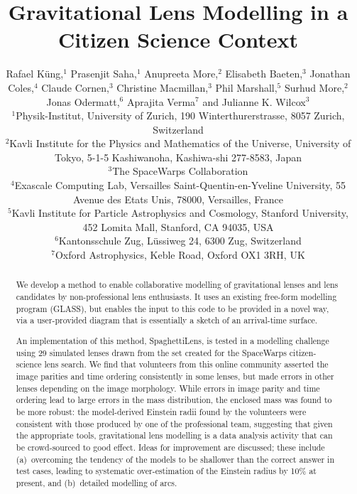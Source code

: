 \documentclass[usenatbib]{mn2e}
\newcommand{\spl}{SpaghettiLens\xspace}
\newcommand{\sw}{SpaceWarps\xspace}
\begin{document}
\title{Gravitational Lens Modelling in a Citizen Science Context}

\author[Küng et al]{Rafael Küng,$^{1}$
Prasenjit Saha,$^{1}$
Anupreeta More,$^{2}$
Elisabeth Baeten,$^{3}$
\newauthor
Jonathan Coles,$^{4}$
Claude Cornen,$^{3}$
Christine Macmillan,$^{3}$
Phil Marshall,$^{5}$ 
\newauthor
Surhud More,$^{2}$
Jonas Odermatt,$^{6}$
Aprajita Verma$^{7}$
and Julianne K. Wilcox$^{3}$
%
\\
%
$^{1}$Physik-Institut, University of Zurich, 190 Winterthurerstrasse, 8057 Zurich, Switzerland\\
$^{2}$Kavli Institute for the Physics and Mathematics of the Universe, University of Tokyo, 5-1-5 Kashiwanoha, Kashiwa-shi 277-8583, Japan\\
$^{3}$The SpaceWarps Collaboration\\
$^{4}$Exascale Computing Lab, Versailles Saint-Quentin-en-Yveline University, 55 Avenue des Etats Unis, 78000, Versailles, France\\
$^{5}$Kavli Institute for Particle Astrophysics and Cosmology, Stanford University, 452 Lomita Mall, Stanford, CA 94035, USA\\
$^{6}$Kantonsschule Zug, L\"ussiweg 24, 6300 Zug, Switzerland\\
$^{7}$Oxford Astrophysics, Keble Road, Oxford OX1 3RH, UK\\
}

\maketitle

\begin{abstract}

We develop a method to enable collaborative modelling of gravitational
lenses and lens candidates by non-professional lens enthusiasts.  It
uses an existing free-form modelling program (GLASS), but
enables the input to this code to be provided in a novel way,
via a user-provided diagram that is essentially a sketch of an
arrival-time surface.

An implementation of this method, \spl, is tested in a modelling
challenge using 29 simulated lenses drawn from the set created
for the \sw citizen-science lens search.  We find that
volunteers from this online community asserted the image
parities and time ordering consistently in some lenses, but made
errors in other lenses depending on the image morphology. While
errors in image parity and time ordering lead to  large errors in the
mass distribution, the enclosed mass was found to be more
robust: the model-derived Einstein radii found by the volunteers were
consistent with those produced by one of the professional team,
suggesting that given the appropriate tools, gravitational lens
modelling is a data analysis activity that can be crowd-sourced to
good effect. Ideas for improvement are discussed; these include
(a)~overcoming the tendency of the models to be shallower than the
correct answer in test cases, leading to systematic over-estimation of
the Einstein radius by 10\% at present, and (b)~detailed modelling of
arcs.

\end{abstract}
\end{document}
